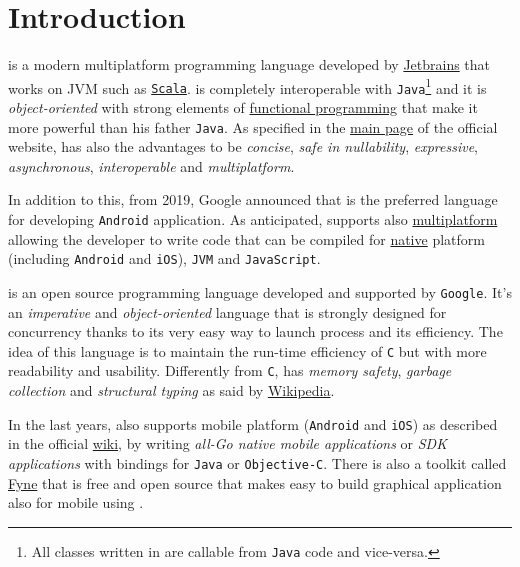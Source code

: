 \section{Introduction}

\Kotlin is a modern multiplatform programming language developed by \href{https://www.jetbrains.com/}{Jetbrains} that works on JVM such as \href{www.scala-lang.org}{\texttt{Scala}}.
\Kotlin is completely interoperable with \texttt{Java}\footnote{All classes written in \Kotlin are callable from \texttt{Java} code and vice-versa.} and it is \textit{object-oriented} with strong elements of \href{https://en.wikipedia.org/wiki/Functional_programming}{functional programming} that make it more powerful than his father \texttt{Java}.
As specified in the \href{https://kotlinlang.org/#why-kotlin}{main page} of the official website, \Kotlin has also the advantages to be \textit{concise}, \textit{safe in nullability}, \textit{expressive}, \textit{asynchronous}, \textit{interoperable} and \textit{multiplatform}.

In addition to this, from 2019, Google announced that \Kotlin is the preferred language for developing  \texttt{Android} application. As anticipated, \Kotlin supports also \href{https://kotlinlang.org/docs/multiplatform.html}{multiplatform} allowing the developer to write \Kotlin code that can be compiled for \href{https://kotlinlang.org/docs/native-overview.html}{native} platform (including \texttt{Android} and \texttt{iOS}), \texttt{JVM} and \texttt{JavaScript}.

\Go is an open source programming language developed and supported by \texttt{Google}.
It's an \textit{imperative} and \textit{object-oriented} language that is strongly designed for concurrency thanks to its very easy way to launch process and its efficiency.
The idea of this language is to maintain the run-time efficiency of \texttt{C} but with more readability and usability. Differently from \texttt{C}, \Go has \textit{memory safety}, \textit{garbage collection} and \textit{structural typing} as said by \href{https://en.wikipedia.org/wiki/Go_(programming_language)}{Wikipedia}.

In the last years, \Go also supports mobile platform (\texttt{Android} and \texttt{iOS}) as described in the official \href{https://github.com/golang/go/wiki/Mobile}{wiki}, by writing \textit{all-Go native mobile applications} or \textit{SDK applications} with bindings for \texttt{Java} or \texttt{Objective-C}.
There is also a toolkit called \href{https://fyne.io/}{Fyne} that is free and open source that makes easy to build graphical application also for mobile using \Go.

